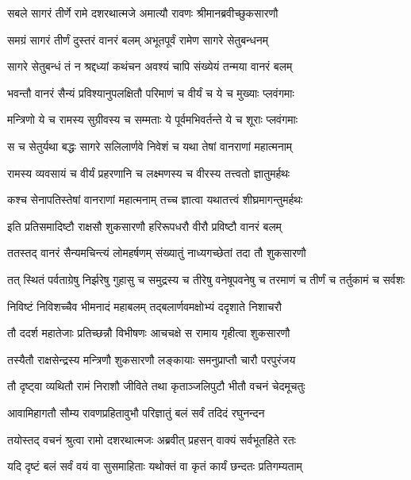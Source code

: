 
\twolineshloka
{सबले सागरं तीर्णे रामे दशरथात्मजे}
{अमात्यौ रावणः श्रीमानब्रवीच्छुकसारणौ} %

\twolineshloka
{समग्रं सागरं तीर्णं दुस्तरं वानरं बलम्}
{अभूतपूर्वं रामेण सागरे सेतुबन्धनम्} %

\twolineshloka
{सागरे सेतुबन्धं तं न श्रद्दध्यां कथंचन}
{अवश्यं चापि संख्येयं तन्मया वानरं बलम्} %

\twolineshloka
{भवन्तौ वानरं सैन्यं प्रविश्यानुपलक्षितौ}
{परिमाणं च वीर्यं च ये च मुख्याः प्लवंगमाः} %

\twolineshloka
{मन्त्रिणो ये च रामस्य सुग्रीवस्य च सम्मताः}
{ये पूर्वमभिवर्तन्ते ये च शूराः प्लवंगमाः} %

\twolineshloka
{स च सेतुर्यथा बद्धः सागरे सलिलार्णवे}
{निवेशं च यथा तेषां वानराणां महात्मनाम्} %

\twolineshloka
{रामस्य व्यवसायं च वीर्यं प्रहरणानि च}
{लक्ष्मणस्य च वीरस्य तत्त्वतो ज्ञातुमर्हथः} %

\twolineshloka
{कश्च सेनापतिस्तेषां वानराणां महात्मनाम्}
{तच्च ज्ञात्वा यथातत्त्वं शीघ्रमागन्तुमर्हथः} %

\twolineshloka
{इति प्रतिसमादिष्टौ राक्षसौ शुकसारणौ}
{हरिरूपधरौ वीरौ प्रविष्टौ वानरं बलम्} %

\twolineshloka
{ततस्तद् वानरं सैन्यमचिन्त्यं लोमहर्षणम्}
{संख्यातुं नाध्यगच्छेतां तदा तौ शुकसारणौ} %

\threelineshloka
{तत् स्थितं पर्वताग्रेषु निर्झरेषु गुहासु च}
{समुद्रस्य च तीरेषु वनेषूपवनेषु च}
{तरमाणं च तीर्णं च तर्तुकामं च सर्वशः} %

\twolineshloka
{निविष्टं निविशच्चैव भीमनादं महाबलम्}
{तद्बलार्णवमक्षोभ्यं ददृशाते निशाचरौ} %

\twolineshloka
{तौ ददर्श महातेजाः प्रतिच्छन्नौ विभीषणः}
{आचचक्षे स रामाय गृहीत्वा शुकसारणौ} %

\twolineshloka
{तस्यैतौ राक्षसेन्द्रस्य मन्त्रिणौ शुकसारणौ}
{लङ्कायाः समनुप्राप्तौ चारौ परपुरंजय} %

\twolineshloka
{तौ दृष्ट्वा व्यथितौ रामं निराशौ जीविते तथा}
{कृताञ्जलिपुटौ भीतौ वचनं चेदमूचतुः} %

\twolineshloka
{आवामिहागतौ सौम्य रावणप्रहितावुभौ}
{परिज्ञातुं बलं सर्वं तदिदं रघुनन्दन} %

\twolineshloka
{तयोस्तद् वचनं श्रुत्वा रामो दशरथात्मजः}
{अब्रवीत् प्रहसन् वाक्यं सर्वभूतहिते रतः} %

\twolineshloka
{यदि दृष्टं बलं सर्वं वयं वा सुसमाहिताः}
{यथोक्तं वा कृतं कार्यं छन्दतः प्रतिगम्यताम्} %


